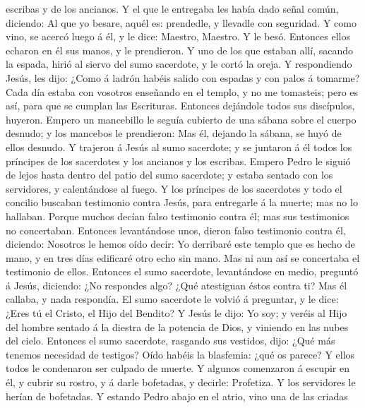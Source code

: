 escribas y de los ancianos.  Y el que le entregaba les
había dado señal común, diciendo: Al que yo besare, aquél es: prendedle,
y llevadle con seguridad.  Y como vino, se acercó luego á
él, y le dice: Maestro, Maestro. Y le besó.  Entonces ellos
echaron en él sus manos, y le prendieron.  Y uno de los que
estaban allí, sacando la espada, hirió al siervo del sumo sacerdote, y
le cortó la oreja.  Y respondiendo Jesús, les dijo: ¿Como á
ladrón habéis salido con espadas y con palos á tomarme? 
Cada día estaba con vosotros enseñando en el templo, y no me tomasteis;
pero es así, para que se cumplan las Escrituras.  Entonces
dejándole todos sus discípulos, huyeron.  Empero un
mancebillo le seguía cubierto de una sábana sobre el cuerpo desnudo; y
los mancebos le prendieron:  Mas él, dejando la sábana, se
huyó de ellos desnudo.  Y trajeron á Jesús al sumo
sacerdote; y se juntaron á él todos los príncipes de los sacerdotes y
los ancianos y los escribas.  Empero Pedro le siguió de
lejos hasta dentro del patio del sumo sacerdote; y estaba sentado con
los servidores, y calentándose al fuego.  Y los príncipes
de los sacerdotes y todo el concilio buscaban testimonio contra Jesús,
para entregarle á la muerte; mas no lo hallaban.  Porque
muchos decían falso testimonio contra él; mas sus testimonios no
concertaban.  Entonces levantándose unos, dieron falso
testimonio contra él, diciendo:  Nosotros le hemos oído
decir: Yo derribaré este templo que es hecho de mano, y en tres días
edificaré otro echo sin mano.  Mas ni aun así se concertaba
el testimonio de ellos.  Entonces el sumo sacerdote,
levantándose en medio, preguntó á Jesús, diciendo: ¿No respondes algo?
¿Qué atestiguan éstos contra ti?  Mas él callaba, y nada
respondía. El sumo sacerdote le volvió á preguntar, y le dice: ¿Eres tú
el Cristo, el Hijo del Bendito?  Y Jesús le dijo: Yo soy; y
veréis al Hijo del hombre sentado á la diestra de la potencia de Dios, y
viniendo en las nubes del cielo.  Entonces el sumo
sacerdote, rasgando sus vestidos, dijo: ¿Qué más tenemos necesidad de
testigos?  Oído habéis la blasfemia: ¿qué os parece? Y
ellos todos le condenaron ser culpado de muerte.  Y algunos
comenzaron á escupir en él, y cubrir su rostro, y á darle bofetadas, y
decirle: Profetiza. Y los servidores le herían de bofetadas.
 Y estando Pedro abajo en el atrio, vino una de las criadas
